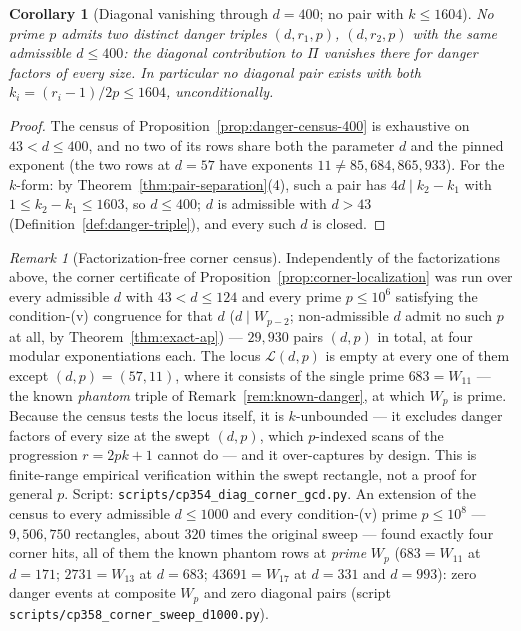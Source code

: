\documentclass[11pt]{amsart}
\theoremstyle{plain}
\newtheorem{corollary}[theorem]{Corollary}
\theoremstyle{definition}
\theoremstyle{remark}
\newtheorem{remark}[theorem]{Remark}
\numberwithin{equation}{section}
\begin{document}
\begin{corollary}[Diagonal vanishing through $d = 400$; no pair with $k \leq 1604$]\label{cor:diagonal-k500}
No prime $p$ admits two distinct danger triples $(d, r_1, p)$, $(d, r_2, p)$ with the same admissible $d \leq 400$: the diagonal contribution to $\Pi$ vanishes there for danger factors of every size. In particular no diagonal pair exists with both $k_i = (r_i - 1)/2p \leq 1604$, unconditionally.
\end{corollary}

\begin{proof}
The census of Proposition~\ref{prop:danger-census-400} is exhaustive on $43 < d \leq 400$, and no two of its rows share both the parameter $d$ and the pinned exponent (the two rows at $d = 57$ have exponents $11 \neq 85{,}684{,}865{,}933$). For the $k$-form: by Theorem~\ref{thm:pair-separation}(4), such a pair has $4 d \mid k_2 - k_1$ with $1 \leq k_2 - k_1 \leq 1603$, so $d \leq 400$; $d$ is admissible with $d > 43$ (Definition~\ref{def:danger-triple}), and every such $d$ is closed.
\end{proof}

\begin{remark}[Factorization-free corner census]\label{rem:corner-sweep}
Independently of the factorizations above, the corner certificate of Proposition~\ref{prop:corner-localization} was run over every admissible $d$ with $43 < d \leq 124$ and every prime $p \leq 10^6$ satisfying the condition-(v) congruence for that $d$ ($d \mid W_{p-2}$; non-admissible $d$ admit no such $p$ at all, by Theorem~\ref{thm:exact-ap}) --- $29{,}930$ pairs $(d, p)$ in total, at four modular exponentiations each. The locus $\mathcal{L}(d, p)$ is empty at every one of them except $(d, p) = (57, 11)$, where it consists of the single prime $683 = W_{11}$ --- the known \emph{phantom} triple of Remark~\ref{rem:known-danger}, at which $W_p$ is prime. Because the census tests the locus itself, it is $k$-unbounded --- it excludes danger factors of every size at the swept $(d, p)$, which $p$-indexed scans of the progression $r = 2 p k + 1$ cannot do --- and it over-captures by design. This is finite-range empirical verification within the swept rectangle, not a proof for general $p$. Script: \texttt{scripts/cp354\_diag\_corner\_gcd.py}. An extension of the census to every admissible $d \leq 1000$ and every condition-(v) prime $p \leq 10^8$ --- $9{,}506{,}750$ rectangles, about $320$ times the original sweep --- found exactly four corner hits, all of them the known phantom rows at \emph{prime} $W_p$ ($683 = W_{11}$ at $d = 171$; $2731 = W_{13}$ at $d = 683$; $43691 = W_{17}$ at $d = 331$ and $d = 993$): zero danger events at composite $W_p$ and zero diagonal pairs (script \texttt{scripts/}\allowbreak\texttt{cp358\_corner\_sweep\_d1000.py}).
\end{remark}
\end{document}
